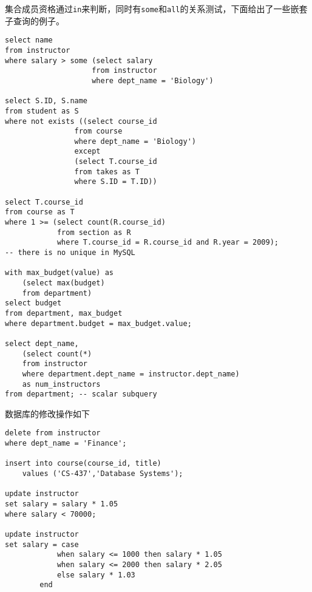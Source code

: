集合成员资格通过\verb'in'来判断，同时有\verb'some'和\verb'all'的关系测试，下面给出了一些嵌套子查询的例子。
\begin{lstlisting}
select name
from instructor
where salary > some (select salary
					from instructor
					where dept_name = 'Biology')

select S.ID, S.name
from student as S
where not exists ((select course_id
				from course
				where dept_name = 'Biology')
				except
				(select T.course_id
				from takes as T
				where S.ID = T.ID))

select T.course_id
from course as T
where 1 >= (select count(R.course_id)
			from section as R
			where T.course_id = R.course_id and R.year = 2009);
-- there is no unique in MySQL

with max_budget(value) as
	(select max(budget)
	from department)
select budget
from department, max_budget
where department.budget = max_budget.value;

select dept_name,
	(select count(*)
	from instructor
	where department.dept_name = instructor.dept_name)
	as num_instructors
from department; -- scalar subquery
\end{lstlisting}

数据库的修改操作如下
\begin{lstlisting}
delete from instructor
where dept_name = 'Finance';

insert into course(course_id, title)
	values ('CS-437','Database Systems');

update instructor
set salary = salary * 1.05
where salary < 70000;

update instructor
set salary = case
			when salary <= 1000 then salary * 1.05
			when salary <= 2000 then salary * 2.05
			else salary * 1.03
		end
\end{lstlisting}